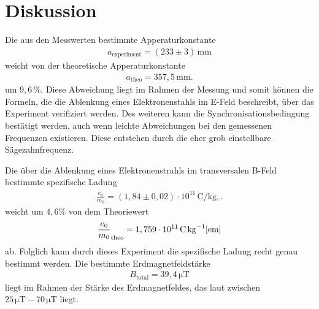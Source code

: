 \newpage
\section{Diskussion}
Die aus den Messwerten bestimmte Apperaturkonstante
\begin{align*}
a_\mathrm{experiment}=(233\pm3)\,\si{\milli\meter}
\end{align*}
weicht von der theoretische Apperaturkonstante
\begin{align*}
  a_\mathrm{theo}=357,5\,\si{\milli\meter}.
\end{align*}
um $9,6\,\si{\percent}$. Diese Abweichung
liegt im Rahmen der Messung
und somit können die Formeln, die die
Ablenkung eines Elektronenstahls im
E-Feld beschreibt, über das Experiment
verifiziert werden.
Des weiteren kann
die Synchronisationsbedingung
bestätigt werden, auch wenn
leichte Abweichungen bei den
gemessenen Frequenzen existieren.
Diese entstehen durch die eher
grob einstellbare Sägezahnfrequenz.

Die über die Ablenkung
eines Elektronenstrahls im transversalen
B-Feld bestimmte spezifische Ladung
\begin{align*}
\overline{\frac{e_0}{m_0}}=(1,84\pm0,02)\cdot 10^{11}\,\si{\coulomb\per\kilo\gram},.
\end{align*}
weicht um $4,6\si{\percent} $
von dem Theoriewert
\begin{align*}
\frac{e_0}{m_0}_\mathrm{theo}=1,759\cdot 10^{11}\,\si{\coulomb\per\kilo\gram} \text{\cite{em}}
\end{align*}
ab. Folglich kann durch dieses Experiment
die spezifische Ladung recht genau bestimmt werden.
Die bestimmte Erdmagnetfeldstärke
\begin{align*}
  B_\mathrm{total}=39,4\,\si{\micro\tesla}
\end{align*}
liegt im Rahmen der Stärke des
Erdmagnetfeldes, das laut \cite{erde}
zwischen $25\,\si{\micro\tesla}-70\,\si{\micro\tesla}$
liegt.
